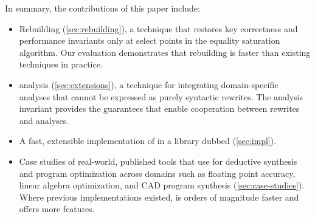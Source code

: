 In summary, the contributions of this paper include:

\begin{itemize}


\item Rebuilding (\autoref{sec:rebuilding}),
  a technique that restores key correctness and performance invariants
  only at select points in the equality saturation algorithm.
  Our evaluation demonstrates that rebuilding is faster than
  existing techniques in practice.

\item \Eclass analysis (\autoref{sec:extensions}),
  a technique for integrating domain-specific analyses
  that cannot be expressed as purely syntactic rewrites.
  The \eclass analysis invariant provides the guarantees
  that enable cooperation between rewrites and analyses.




\item A fast, extensible implementation of
  \egraphs in a library dubbed \egg (\autoref{sec:impl}).

\item Case studies of real-world, published tools that use \egg
    for deductive synthesis and program optimization across domains such as
    floating point accuracy,
    linear algebra optimization,
    and CAD program synthesis
    (\autoref{sec:case-studies}).
    Where previous implementations existed,
      \egg is orders of magnitude faster and offers more features.
\end{itemize}



